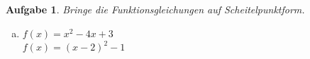 \documentclass[11pt,fleqn]{article}
\theoremstyle{aufg}
\newtheorem{aufgabe}{Aufgabe}
\theoremstyle{bsp}
\begin{document}
\begin{flushleft}
\begin{aufgabe}
Bringe die Funktionsgleichungen auf Scheitelpunktform. \\ 
\begin{multicols}{3} 
\begin{enumerate}[a)] 
\item 
$f(x)=x^{2} - 4 x + 3$ \\ 
$f(x)=\left(x - 2\right)^{2} - 1$ \\ 

\end{enumerate} 
\end{multicols} 
\end{aufgabe} 
\end{flushleft} 
    
\end{document}
